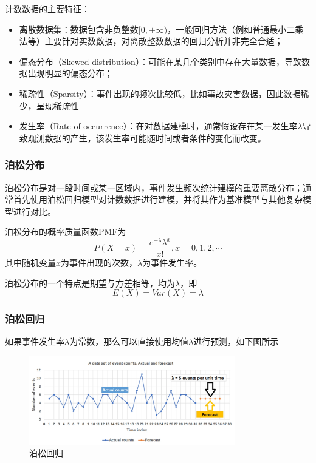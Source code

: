 计数数据的主要特征：

\begin{itemize}[itemsep=0pt,parsep=0pt]
    \item 离散数据集：数据包含非负整数$[0,+\infty)$，一般回归方法（例如普通最小二乘法等）主要针对实数数据，对离散整数数据的回归分析并非完全合适；
    \item 偏态分布（Skewed distribution）：可能在某几个类别中存在大量数据，导致数据出现明显的偏态分布；
    \item 稀疏性（Sparsity）：事件出现的频次比较低，比如事故灾害数据，因此数据稀少，呈现稀疏性
    \item 发生率（Rate of occurrence）：在对数据建模时，通常假设存在某一发生率$λ$导致观测数据的产生，该发生率可能随时间或者条件的变化而改变。
\end{itemize}

\subsubsection{泊松分布}

泊松分布是对一段时间或某一区域内，事件发生频次统计建模的重要离散分布；通常首先使用泊松回归模型对计数数据进行建模，并将其作为基准模型与其他复杂模型进行对比。

泊松分布的概率质量函数PMF为
\begin{equation}
    P(X=x) = \frac{e^{-\lambda}\lambda^x}{x!}, x=0,1,2,\cdots
\end{equation}
其中随机变量$x$为事件出现的次数，$\lambda$为事件发生率。

泊松分布的一个特点是期望与方差相等，均为$\lambda$，即
\begin{equation}
    E(X) = Var(X) = \lambda
\end{equation}

\subsubsection{泊松回归}

如果事件发生率$\lambda$为常数，那么可以直接使用均值$\lambda$进行预测，如下图所示
\begin{figure}[ht]
    \centering
    \includegraphics[width=0.8\textwidth]{pic/2.6.2.png}
    \caption{泊松回归}
\end{figure}

